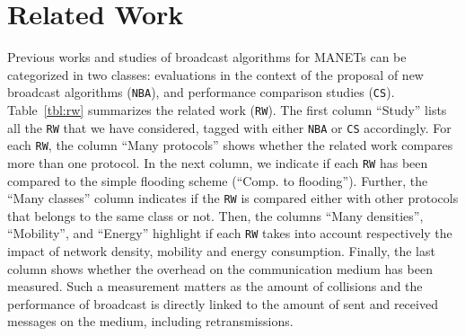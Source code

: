 
\section{Related Work}
\label{sec:related_work}

Previous works and studies of broadcast algorithms for MANETs can be categorized in two classes: evaluations in the context of the proposal of new broadcast algorithms (\texttt{NBA}), and performance comparison studies (\texttt{CS}).
%
Table~\ref{tbl:rw} summarizes the related work (\texttt{RW}).
%
The first column ``Study'' lists all the \texttt{RW} that we have
considered, tagged with either \texttt{NBA} or \texttt{CS} accordingly. For each \texttt{RW}, the column ``Many protocols'' shows whether the related work compares more than one protocol.
%
In the next column, we indicate if each \texttt{RW} has been compared to the simple flooding scheme (``Comp. to flooding'').
%
Further, the ``Many classes'' column indicates if the \texttt{RW}  is
compared either with other protocols that belongs to the same class or
not. 
%
Then, the columns ``Many densities'', ``Mobility'', and ``Energy''
highlight if each \texttt{RW} takes
into account respectively the impact of network density, mobility and energy consumption.
%
%
%
%
Finally, the last column shows whether the overhead on the
communication medium has been measured.
%
Such a measurement matters as the amount of collisions and the performance of broadcast is directly linked to the amount of sent and received messages on the medium, including retransmissions.



